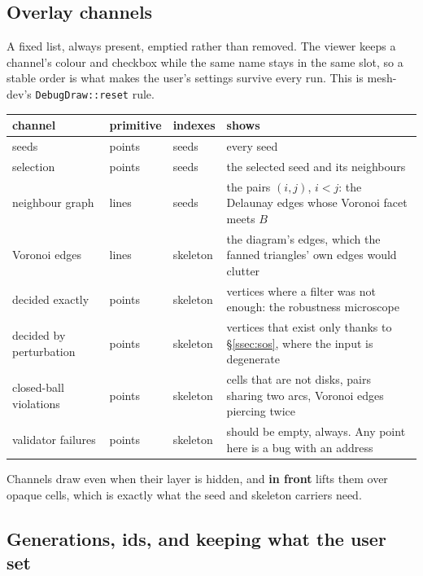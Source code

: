 \documentclass[11pt,a4paper]{article}
\newcommand{\code}[1]{\texttt{#1}}          %
\newcommand{\secref}[1]{\S\ref{#1}}
\begin{document}
\subsection{Overlay channels}\label{ssec:channels}

A fixed list, always present, emptied rather than removed. The viewer keeps a channel's colour
and checkbox while the same name stays in the same slot, so a stable order is what makes the
user's settings survive every run. This is mesh-dev's \code{DebugDraw::reset} rule.

{\small
\begin{xltabular}{\linewidth}{@{}P{3.3cm} P{1.5cm} P{1.6cm} L@{}}
\toprule
channel & primitive & indexes & shows \\
\midrule
\endhead
seeds                   & points & seeds    & every seed \\
selection               & points & seeds    & the selected seed and its neighbours \\
neighbour graph         & lines  & seeds    & the pairs $(i,j)$, $i<j$: the Delaunay edges whose
                                              Voronoi facet meets $B$ \\
Voronoi edges           & lines  & skeleton & the diagram's edges, which the fanned triangles'
                                              own edges would clutter \\
decided exactly         & points & skeleton & vertices where a filter was not enough: the
                                              robustness microscope \\
decided by perturbation & points & skeleton & vertices that exist only thanks to
                                              \secref{ssec:sos}, where the input is degenerate \\
closed-ball violations  & points & skeleton & cells that are not disks, pairs sharing two arcs,
                                              Voronoi edges piercing twice \\
validator failures      & points & skeleton & should be empty, always. Any point here is a bug
                                              with an address \\
\bottomrule
\end{xltabular}}

Channels draw even when their layer is hidden, and \textbf{in front} lifts them over opaque
cells, which is exactly what the seed and skeleton carriers need.

\subsection{Generations, ids, and keeping what the user set}\label{ssec:generations}
\end{document}
